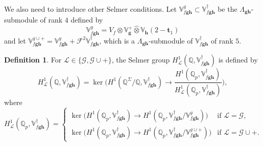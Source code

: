 \documentclass[a4paper,11pt]{amsart}
\theoremstyle{plain}
\theoremstyle{definition}
\newtheorem{defi}[theorem]{Definition}
\theoremstyle{remark}
\newcommand{\bb}{\mathbb}
\newcommand{\cl}{\mathcal}
\newcommand{\hg}{{\mathbf{g}}}
\newcommand{\hh}{{\mathbf h}}
\numberwithin{equation}{section}
\begin{document}
We also need to introduce other Selmer conditions. Let $\bb{V}_{f\hg\hh}^g\subset \bb{V}_{f\hg\hh}^\dagger$ be the $\Lambda_{\hg\hh}$-submodule of rank $4$ defined by
\[
\bb{V}_{f\hg\hh}^g=V_f\otimes \bb{V}_{\hg}^+\hat{\otimes}\bb{V}_\hh(2-\mathbf{t}_1)
\]
and let $\bb{V}_{f\hg\hh}^{g\cup +}=\bb{V}_{f\hg\hh}^g+\mathscr{F}^2\bb{V}_{f\hg\hh}^\dagger$, which is a $\Lambda_{\hg\hh}$-submodule of $\bb{V}_{f\hg\hh}^\dagger$ of rank $5$.%

\begin{defi}
For $\mathcal{L}\in\{\mathcal{G},\mathcal{G}\cup +\}$, the Selmer group $H^1_{\mathcal{L}}(\bb{Q},\mathbb V_{f\hg\hh}^{\dag})$ is defined by
\[
H^1_{\mathcal{L}}(\bb{Q},\mathbb V_{f\hg\hh}^{\dag}) = \ker \bigg(
H^1(\mathbb Q^\Sigma/\mathbb Q, \mathbb V_{f \hg\hh}^{\dag}) \longrightarrow
\frac{H^1(\mathbb Q_p,\mathbb V_{f \hg\hh}^\dag)}{H^1_{\mathcal{L}}(\mathbb Q_p,\mathbb V_{f \hg\hh}^\dag)}\bigg),
\]
where
\[
H_{\mathcal L}^1(\mathbb Q_p, \mathbb V_{f\hg\hh}^{\dag}) =
\begin{cases}
\ker \big(H^1(\mathbb Q_p, \mathbb V_{f\hg\hh}^{\dag}) \longrightarrow H^1(\mathbb Q_p, \mathbb V_{f \hg\hh}^{\dag}/\bb{V}_{f\hg\hh}^g) \big) &\textrm{if $\mathcal{L}=\cl{G}$},\\[0.5em]
\ker \big(H^1(\mathbb Q_p, \mathbb V_{f \hg\hh}^{\dag}) \longrightarrow H^1(\mathbb Q_p, \mathbb V_{f\hg\hh}^{\dag}/ \mathbb V_{f\hg\hh}^{g\cup +}) \big) &\textrm{if $\mathcal{L}=\mathcal{G}\cup +$}. %
\end{cases}
\]
\end{defi}
\end{document}
